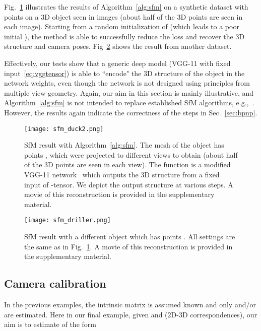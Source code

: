 \documentclass[10pt,twocolumn,letterpaper]{article}
\begin{document}
Fig.~\ref{fig:sfm_duck} illustrates the results of Algorithm~\ref{alg:sfm} on a synthetic dataset with  points on a 3D object seen in  images (about half of the 3D points are seen in each image). Starting from a random initialization of  (which leads to a poor initial ), the method is able to successfully reduce the loss and recover the 3D structure and camera poses. Fig~\ref{fig:sfm_driller} shows the result from another dataset.

Effectively, our tests show that a generic deep model (VGG-11 with fixed input~\eqref{eq:vggtensor}) is able to ``encode" the 3D structure  of the object in the network weights, even though the network is not designed using principles from multiple view geometry. Again, our aim in this section is mainly illustrative, and Algorithm~\ref{alg:sfm} is not intended to replace established SfM algorithms, e.g.,~\cite{schoenberger2016pixelwise, schoenberger2016structure}. However, the results again indicate the correctness of the steps in Sec.~\ref{sec:bpnp}.

\begin{figure}[t]
    \centering
    \texttt{[image: sfm\_duck2.png]}
    \caption{SfM result with Algorithm~\ref{alg:sfm}. The mesh of the object has  points , which were projected to  different views to obtain  (about half of the 3D points are seen in each view). The function  is a modified VGG-11 network~\cite{Simonyan2015very} which outputs the 3D structure  from a fixed input of -tensor. We depict the output structure  at various steps. A movie of this reconstruction is provided in the supplementary material.}
    \label{fig:sfm_duck}
\end{figure}

\begin{figure}\centering
    \texttt{[image: sfm\_driller.png]}
    \caption{SfM result with a different object which has  points . All settings are the same as in Fig.~\ref{fig:sfm_duck}. A movie of this reconstruction is provided in the supplementary material.}
    \label{fig:sfm_driller}
\end{figure}


\subsection{Camera calibration}

In the previous examples, the intrinsic matrix  is assumed known and only  and/or  are estimated. Here in our final example, given  and  (2D-3D correspondences), our aim is to estimate  of the form
\end{document}
